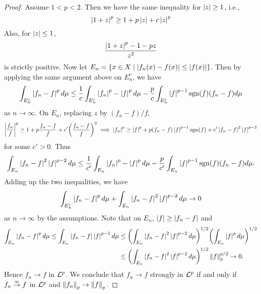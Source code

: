 \begin{proof}
    Assume $1<p<2$. Then we have the same inequality for $\left\lvert {z} \right\rvert\geq 1$, i.e., 
    \begin{equation*}
        \left\lvert {1+z} \right\rvert^p \geq 1 + p\left\lvert {z} \right\rvert + c\left\lvert {z} \right\rvert^p
    \end{equation*}
    Also, for $\left\lvert {z} \right\rvert\leq 1$, 
    \begin{equation*}
        \frac{\left\lvert {1+z} \right\rvert^p-1-pz}{z^2}
    \end{equation*}
    is strictly positive. Now let $E_n = \left\{ x\in X \;\middle\vert\; \left\lvert {f_n(x)-f(x)} \right\rvert\leq \left\lvert {f(x)} \right\rvert \right\}$. Then 
    by applying the same argument above on $E_n^c$, we have 
    \begin{equation*}
        \int_{E_n^c} \left\lvert {f_n-f} \right\rvert^pd\mu \leq \frac{1}{c}\int_{E_n^c}\left\lvert {f_n} \right\rvert^p-\left\lvert {f} \right\rvert^pd\mu - \frac{p}{c}\int_{E_n^c}\left\lvert {f} \right\rvert^{p-1}\operatorname{sgn}(f)(f_n-f)d\mu
    \end{equation*} 
    as $n\to\infty$. On $E_n$, replacing $z$ by $(f_n-f)/f$,
    \begin{equation*}
        \abs{\frac{f_n}{f}}^p \geq 1 + p\frac{f_n-f}{f} + c'\pth{\frac{f_n-f}{f}}^2 
        \implies \abs{f_n}^p \geq \abs{f}^p + p(f_n-f)\abs{f}^{p-1}\sgn(f) + c'\abs{f_n-f}^2\abs{f}^{p-2}
    \end{equation*}
    for some $c'>0$. Thus
    \begin{equation*}
        \int_{E_n} \left\lvert {f_n-f} \right\rvert^2\left\lvert {f} \right\rvert^{p-2}d\mu \leq \frac{1}{c'}\int_{E_n}\left\lvert {f_n} \right\rvert^p-\left\lvert {f} \right\rvert^pd\mu - \frac{p}{c'}\int_{E_n}\left\lvert {f} \right\rvert^{p-1}\operatorname{sgn}(f)(f_n-f)d\mu.
    \end{equation*}
    Adding up the two inequalities, we have 
    \begin{equation*}
        \int_{E_n^c} \left\lvert {f_n-f} \right\rvert^pd\mu + \int_{E_n} \left\lvert {f_n-f} \right\rvert^2\left\lvert {f} \right\rvert^{p-2}d\mu \to 0
    \end{equation*}
    as $n\to\infty$ by the assumptions. Note that on $E_n$, $\left\lvert {f} \right\rvert\geq \left\lvert {f_n-f} \right\rvert$ and 
    \begin{equation*}
        \begin{split}
            \int_{E_n} \abs{f_n-f}^pd\mu \leq \int_{E_n} \abs{f_n-f}\abs{f}^{p-1}d\mu 
            &\leq \pth{\int_{E_n} \abs{f_n-f}^2\abs{f}^{p-2}d\mu}^{1/2}\pth{\int_{E_n}\abs{f}^pd\mu}^{1/2} \\
            &\leq \pth{\int_{E_n} \abs{f_n-f}^2\abs{f}^{p-2}d\mu}^{1/2}\norm{f}_p^{p/2}\to 0.
        \end{split}
    \end{equation*}
    Hence $f_n\to f$ in $\mathcal{L}^p$. We conclude that $f_n\to f$ strongly in $\mathcal{L}^p$ if and only if
    $f_n\overset{w}{\to} f$ in $\mathcal{L}^p$ and $\left\lVert {f_n} \right\rVert_p\to\left\lVert {f} \right\rVert_p$.
\end{proof}
